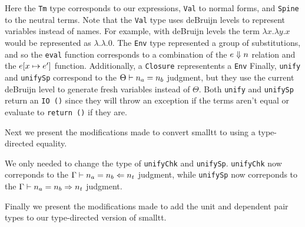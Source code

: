 Here the \lstinline{Tm} type corresponds to our expressions, \lstinline{Val} to normal forms, and \lstinline{Spine} to the neutral terms.
Note that the \lstinline{Val} type uses deBruijn levels to represent variables instead of names.
For example, with deBruijn levels the term $\lambda x. \lambda y. x$ would be represented as $\lambda. \lambda. 0$.
The \lstinline{Env} type represented a group of substitutions, and so the \lstinline{eval} function corresponds to a combination of the $e \Downarrow n$ relation and the $e [x \mapsto e']$ function.
Additionally, a \lstinline{Closure} representents a \lstinline{Env}
Finally, \lstinline{unify} and \lstinline{unifySp} correspond to the $\Theta \vdash n_a = n_b$ judgment, but they use the current deBruijn level to generate fresh variables instead of $\Theta$.
Both \lstinline{unify} and \lstinline{unifySp} return an \lstinline{IO ()} since they will throw an exception if the terms aren't equal or evaluate to \lstinline{return ()} if they are.

Next we present the modifications made to convert smalltt to using a type-directed equality.

We only needed to change the type of \lstinline{unifyChk} and \lstinline{unifySp}.
\lstinline{unifyChk} now correponds to the $\Gamma \vdash n_a = n_b \Leftarrow n_t$ judgment, while \lstinline{unifySp} now correponds to the $\Gamma \vdash n_a = n_b \Rightarrow n_t$ judgment.

Finally we present the modifications made to add the unit and dependent pair types to our type-directed version of smalltt.


